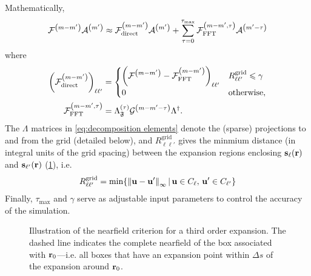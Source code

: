 Mathematically,  
\begin{equation}
  \begin{aligned}
    \mathcal{F}^\qty(m - m')\mathcal{A}^\qty(m') \approx \mathcal{F}^\qty(m-m')_\text{direct} \mathcal{A}^\qty(m') + \sum_{\tau = 0}^{\tau_\text{max}} \mathcal{F}^\qty(m-m', \tau)_\text{FFT} \mathcal{A}^\qty(m' - \tau)
    \end{aligned}
  \label{eq:f decomposition}
\end{equation}
where
\begin{subequations}
  \begin{align}
    \qty(\mathcal{F}^\qty(m-m')_\text{direct})_{\ell\ell'} &= \begin{cases}
      \qty(\mathcal{F}^\qty(m-m') - \mathcal{F}^\qty(m-m')_\text{FFT})_{\ell\ell'} & R^\text{grid}_{\ell\ell'} \leqslant \gamma \\
      0 & \text{otherwise},
    \end{cases} \\
    \mathcal{F}^\qty(m-m', \tau)_\text{FFT} &=  \Lambda_\mathfrak{F}^\qty(\tau) \mathcal{G}^\qty(m - m' - \tau) \Lambda^\dagger.
  \end{align}
  \label{eq:decomposition elements}
\end{subequations}
The $\Lambda$ matrices in \cref{eq:decomposition elements} denote the (sparse) projections to and from the grid (detailed below), and $R^\text{grid}_{\ell\ell'}$ gives the minmium distance (in integral units of the grid spacing) between the expansion regions enclosing $\vb{s}_\ell(\vb{r})$ and $\vb{s}_{\ell'}(\vb{r})$ (\cref{fig:nearfield criterion}), i.e.
\begin{equation}
  R^\text{grid}_{\ell\ell'} = \min\!\qty{\norm{\vb{u} - \vb{u}'}_\infty \, | \, \vb{u} \in C_\ell, \, \vb{u}' \in C_{\ell'}}
\end{equation}
Finally, $\tau_\text{max}$ and $\gamma$ serve as adjustable input parameters to control the accuracy of the simulation.

\begin{figure}
  \centering
  
  \caption{\label{fig:nearfield criterion}Illustration of the nearfield criterion for a third order expansion.
    The dashed line indicates the complete nearfield of the box associated with \textcolor{cbblue}{$\vb{r}_0$}---i.e. all boxes that have an expansion point within $\Delta s$ of the expansion around \textcolor{cbblue}{$\vb{r}_0$}.
  }
\end{figure}

